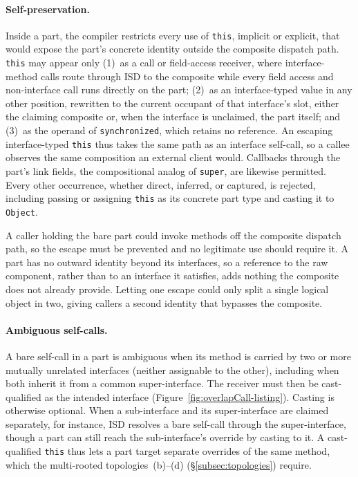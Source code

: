 \documentclass[acmsmall,screen,review,anonymous]{acmart}
\theoremstyle{acmplain}
\newcommand{\code}[1]{\texttt{#1}}
\begin{document}
\paragraph{Self-preservation.}
Inside a part, the compiler restricts every use of \code{this}, implicit or explicit, that would expose the part's concrete
identity outside the composite dispatch path. \code{this} may appear only (1)~as a call or field-access receiver, where
interface-method calls route through ISD to the composite while every field access and non-interface call runs directly
on the part; (2)~as an interface-typed value in any other position, rewritten to the current occupant of that interface's
slot, either the claiming composite or, when the interface is unclaimed, the part itself; and (3)~as the operand of \code{synchronized},
which retains no reference. An escaping interface-typed \code{this} thus takes the same path as an interface self-call,
so a callee observes the same composition an external client would. Callbacks through the part's link fields, the compositional
analog of \code{super}, are likewise permitted. Every other occurrence, whether direct, inferred, or captured, is rejected,
including passing or assigning \code{this} as its concrete part type and casting it to \code{Object}.

A caller holding the bare part could invoke methods off the composite dispatch path, so the escape must be prevented and
no legitimate use should require it. A part has no outward identity beyond its interfaces, so a reference to the raw component,
rather than to an interface it satisfies, adds nothing the composite does not already provide. Letting one escape could
only split a single logical object in two, giving callers a second identity that bypasses the composite.

\paragraph{Ambiguous self-calls.}
A bare self-call in a part is ambiguous when its method is carried by two or more mutually unrelated interfaces (neither
assignable to the other), including when both inherit it from a common super-interface. The receiver must then be cast-qualified
as the intended interface (Figure~\ref{fig:overlapCall-listing}). Casting is otherwise optional. When a sub-interface and
its super-interface are claimed separately, for instance, ISD resolves a bare self-call through the super-interface, though
a part can still reach the sub-interface's override by casting to it. A cast-qualified \code{this} thus lets a part target
separate overrides of the same method, which the multi-rooted topologies~(b)--(d) (\S\ref{subsec:topologies}) require.
\end{document}
